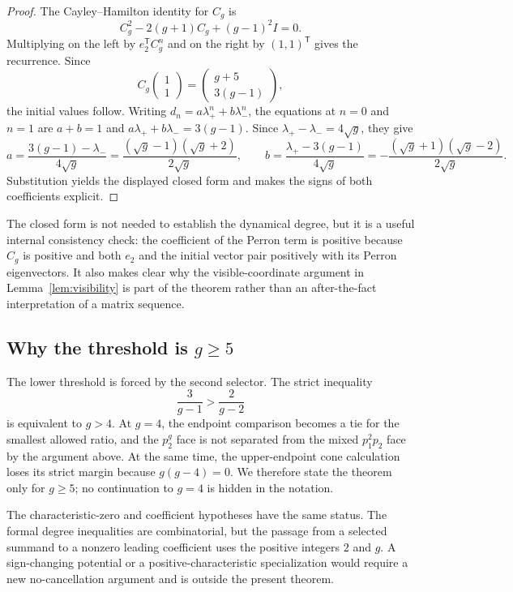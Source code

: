 \documentclass[11pt]{article}
\theoremstyle{remark}
\numberwithin{equation}{section}
\begin{document}
\begin{proof}
The Cayley--Hamilton identity for \(C_g\) is
\[
 C_g^2-2(g+1)C_g+(g-1)^2I=0.
\]
Multiplying on the left by \(e_2^{\mathsf T}C_g^n\) and on the right by
\((1,1)^{\mathsf T}\) gives the recurrence.  Since
\[
 C_g\begin{pmatrix}1\\1\end{pmatrix}
 =\begin{pmatrix}g+5\\3(g-1)\end{pmatrix},
\]
  the initial values follow.  Writing
  \(d_n=a\lambda_+^n+b\lambda_-^n\), the equations at \(n=0\) and \(n=1\)
  are \(a+b=1\) and
  \(a\lambda_++b\lambda_-=3(g-1)\).  Since
  \(\lambda_+-\lambda_-=4\sqrt g\), they give
  \[
   a=\frac{3(g-1)-\lambda_-}{4\sqrt g}
    =\frac{(\sqrt g-1)(\sqrt g+2)}{2\sqrt g},
   \qquad
   b=\frac{\lambda_+-3(g-1)}{4\sqrt g}
    =-\frac{(\sqrt g+1)(\sqrt g-2)}{2\sqrt g}.
  \]
  Substitution yields the displayed closed form and makes the signs of both
  coefficients explicit.
\end{proof}

The closed form is not needed to establish the dynamical degree, but it is a
useful internal consistency check: the coefficient of the Perron term is
positive because \(C_g\) is positive and both \(e_2\) and the initial vector
pair positively with its Perron eigenvectors.  It also makes clear why the
visible-coordinate argument in Lemma~\ref{lem:visibility} is part of the
theorem rather than an after-the-fact interpretation of a matrix sequence.

\subsection{Why the threshold is \(g\geq5\)}

The lower threshold is forced by the second selector.  The strict inequality
\[
 \frac{3}{g-1}>\frac{2}{g-2}
\]
is equivalent to \(g>4\).  At \(g=4\), the endpoint comparison becomes a tie
for the smallest allowed ratio, and the \(p_2^g\) face is not separated from
the mixed \(p_1^2p_2\) face by the argument above.  At the same time, the
upper-endpoint cone calculation loses its strict margin because
\(g(g-4)=0\).  We therefore state the theorem only for \(g\geq5\); no
continuation to \(g=4\) is hidden in the notation.

The characteristic-zero and coefficient hypotheses have the same status.  The
formal degree inequalities are combinatorial, but the passage from a
selected summand to a nonzero leading coefficient uses the positive integers
\(2\) and \(g\).  A sign-changing potential or a positive-characteristic
specialization would require a new no-cancellation argument and is outside
the present theorem.
\end{document}
